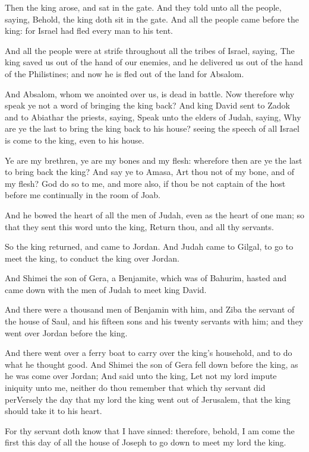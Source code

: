 \Verse Then the king arose, and sat in the gate. And they told unto all the people, saying, Behold, the king doth sit in the gate. And all the people came before the king: for Israel had fled every man to his tent.

\Verse And all the people were at strife throughout all the tribes of Israel, saying, The king saved us out of the hand of our enemies, and he delivered us out of the hand of the Philistines; and now he is fled out of the land for Absalom.

\Verse And Absalom, whom we anointed over us, is dead in battle. Now therefore why speak ye not a word of bringing the king back?  \Verse And king David sent to Zadok and to Abiathar the priests, saying, Speak unto the elders of Judah, saying, Why are ye the last to bring the king back to his house? seeing the speech of all Israel is come to the king, even to his house.

\Verse Ye are my brethren, ye are my bones and my flesh: wherefore then are ye the last to bring back the king?  \Verse And say ye to Amasa, Art thou not of my bone, and of my flesh? God do so to me, and more also, if thou be not captain of the host before me continually in the room of Joab.

\Verse And he bowed the heart of all the men of Judah, even as the heart of one man; so that they sent this word unto the king, Return thou, and all thy servants.

\Verse So the king returned, and came to Jordan. And Judah came to Gilgal, to go to meet the king, to conduct the king over Jordan.

\Verse And Shimei the son of Gera, a Benjamite, which was of Bahurim, hasted and came down with the men of Judah to meet king David.

\Verse And there were a thousand men of Benjamin with him, and Ziba the servant of the house of Saul, and his fifteen sons and his twenty servants with him; and they went over Jordan before the king.

\Verse And there went over a ferry boat to carry over the king's household, and to do what he thought good. And Shimei the son of Gera fell down before the king, as he was come over Jordan; \Verse And said unto the king, Let not my lord impute iniquity unto me, neither do thou remember that which thy servant did perVersely the day that my lord the king went out of Jerusalem, that the king should take it to his heart.

\Verse For thy servant doth know that I have sinned: therefore, behold, I am come the first this day of all the house of Joseph to go down to meet my lord the king.

